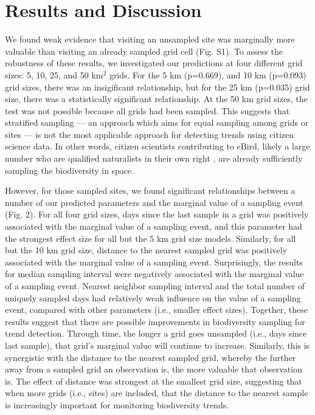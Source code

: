 \documentclass[9pt,twocolumn,twoside,lineno]{pnas-new}
\begin{document}
\section*{Results and Discussion}
We found weak evidence that visiting an unsampled site was marginally more valuable than visiting an already sampled grid cell (Fig. S1). To assess the robustness of these results, we investigated our predictions at four different grid sizes: 5, 10, 25, and 50 km$^{2}$ grids. For the 5 km (p=0.669), and 10 km (p=0.093) grid sizes, there was an insigificant relationship, but for the 25 km (p=0.035) grid size, there was a statistically significant relationship. At the 50 km grid sizes, the test was not possible because all grids had been sampled. This suggests that stratified sampling --- an approach which aims for equal sampling among grids or sites --- \cite{baillie2008toward, longino1997biodiversity} is not the most applicable approach for detecting trends using citizen science data. In other words, citizen scientists contributing to eBird, likely a large number who are qualified naturalists in their own right \cite{callaghan2018unnatural}, are already sufficiently sampling the biodiversity in space.

However, for those sampled sites, we found significant relationships between a number of our predicted parameters and the marginal value of a sampling event (Fig. 2). For all four grid sizes, days since the last sample in a grid was positively associated with the marginal value of a sampling event, and this parameter had the strongest effect size for all but the 5 km grid size models. Similarly, for all but the 10 km grid size, distance to the nearest sampled grid was positively associated with the marginal value of a sampling event. Surprisingly, the results for median sampling interval were negatively associated with the marginal value of a sampling event. Nearest neighbor sampling interval and the total number of uniquely sampled days had relatively weak influence on the value of a sampling event, compared with other parameters (i.e., smaller effect sizes). Together, these results suggest that there are possible improvements in biodiversity sampling for trend detection. Through time, the longer a grid goes unsampled (i.e., days since last sample), that grid's marginal value will continue to increase. Similarly, this is synergistic with the distance to the nearest sampled grid, whereby the further away from a sampled grid an observation is, the more valuable that observation is. The effect of distance was strongest at the smallest grid size, suggesting that when more grids (i.e., sites) are included, that the distance to the nearest sample is increasingly important for monitoring biodiversity trends.
\end{document}
